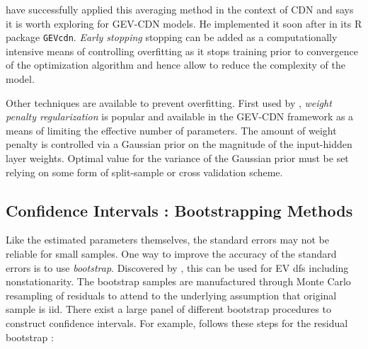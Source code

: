  
\citet{Carney_2005} have successfully applied this averaging method in the context of CDN and \citet{cannon_flexible_2010} says it is worth exploring for GEV-CDN models. He implemented it soon after in its R package \texttt{GEVcdn}. \emph{Early stopping} stopping can be added as a computationally intensive means of controlling overfitting as it stops training prior to convergence of the optimization algorithm and hence allow to reduce the complexity of the model.

Other techniques are available to prevent overfitting. First used by \citet{mackay92b}, \emph{weight penalty regularization} is popular and available in the GEV-CDN framework as a means of limiting the effective number of parameters. The amount of weight penalty is
controlled via a Gaussian prior on the magnitude of the input-hidden layer weights. Optimal value for the
variance of the Gaussian prior must be set relying on some form of split-sample or cross validation scheme.



\subsection{Confidence Intervals : Bootstrapping Methods}\label{sec:nnboot}

Like the estimated parameters themselves, the standard errors may not be reliable for small samples. One way to improve the accuracy of the standard errors is to use \emph{bootstrap}. Discovered by \citet{efron1979}, this can be used for EV dfs including nonstationarity. The bootstrap samples are manufactured through
Monte Carlo resampling of residuals to attend to the underlying assumption  that original sample is iid.
There exist a large panel of different bootstrap procedures to construct confidence intervals.  For example, \citet{2006JHyd..329..534K} follows these steps for the residual bootstrap : 
 
